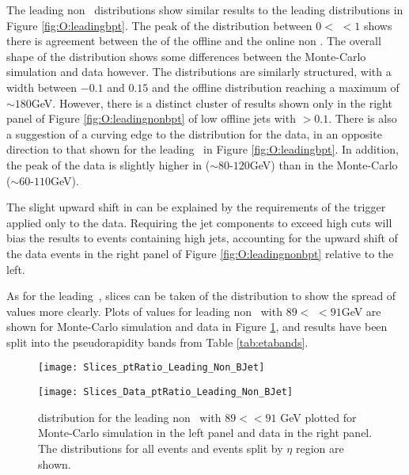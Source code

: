	The leading non \bjet\ distributions show similar results to the leading \bjet distributions in Figure \ref{fig:O:leadingbpt}. The peak of the distribution between $0<$ \dptpt$<1$ shows there is agreement between the \pt of the offline and the online non \bjet. The overall shape of the distribution shows some differences between the Monte-Carlo simulation and data however. The distributions are similarly structured, with a \dptpt width between $-0.1$ and $0.15$ and the \pt offline distribution reaching a maximum \value of $\sim180$GeV. However, there is a distinct cluster of results shown only in the right panel of Figure \ref{fig:O:leadingnonbpt} of low \pt offline jets with \dptpt$>0.1$. There is also a suggestion of a curving edge to the distribution for the data, in an opposite direction to that shown for the leading \bjet\ in Figure \ref{fig:O:leadingbpt}. In addition, the peak of the data is slightly higher in \pt ($\sim80$-$120$GeV) than in the Monte-Carlo ($\sim60$-$110$GeV).

	\newpage
	The slight upward shift in \pt can be explained by the \pt requirements of the trigger applied only to the data. Requiring the jet components to exceed high \pt cuts will bias the results to events containing high \pt jets, accounting for the upward \pt shift of the data events in the right panel of Figure \ref{fig:O:leadingnonbpt} relative to the left.

	As for the leading \bjet\,, slices can be taken of the \dptpt distribution to show the spread of values more clearly. Plots of \dptpt values for leading non \bjets\ with $89<$ \pt$<91$GeV are shown for Monte-Carlo simulation and data in Figure \ref{fig:O:leadingnonbptslice}, and results have been split into the pseudorapidity bands from Table \ref{tab:etabands}.

	\begin{figure}[h]
		\centering

		\begin{minipage}[h]{0.48\linewidth}
			\texttt{[image: Slices\_ptRatio\_Leading\_Non\_BJet]}
		\end{minipage}
		\quad
		\begin{minipage}[h]{0.48\linewidth}
			\texttt{[image: Slices\_Data\_ptRatio\_Leading\_Non\_BJet]}
		\end{minipage}
		\caption{\dptpt distribution for the leading non \bjet\, with $89<$\pt$<91$ GeV plotted for Monte-Carlo simulation in the left panel and data in the right panel. The distributions for all events and events split by $\eta$ region are shown.}
		\label{fig:O:leadingnonbptslice}
	\end{figure}

